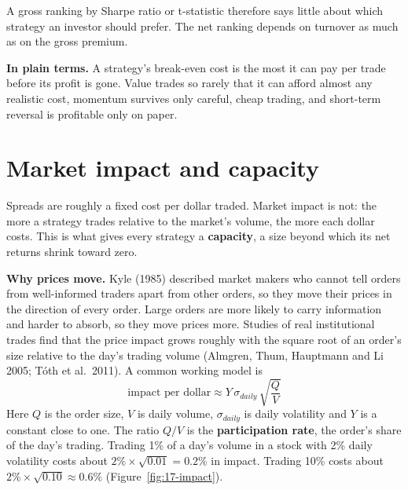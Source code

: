 
A gross ranking by Sharpe ratio or t-statistic therefore says little about which strategy an investor should prefer. The net ranking depends on turnover as much as on the gross premium.

\noindent\textbf{In plain terms.} A strategy's break-even cost is the most it can pay per trade before its profit is gone. Value trades so rarely that it can afford almost any realistic cost, momentum survives only careful, cheap trading, and short-term reversal is profitable only on paper.

\section{Market impact and capacity}
\label{sec:17-capacity}

Spreads are roughly a fixed cost per dollar traded. Market impact is not: the more a strategy trades relative to the market's volume, the more each dollar costs. This is what gives every strategy a \textbf{capacity}, a size beyond which its net returns shrink toward zero.

\textbf{Why prices move.} Kyle (1985) described market makers who cannot tell orders from well-informed traders apart from other orders, so they move their prices in the direction of every order. Large orders are more likely to carry information and harder to absorb, so they move prices more. Studies of real institutional trades find that the price impact grows roughly with the square root of an order's size relative to the day's trading volume (Almgren, Thum, Hauptmann and Li 2005; T\'oth et al.\ 2011). A common working model is
\begin{equation}
  \text{impact per dollar} \approx Y\,\sigma_{daily}\,\sqrt{\frac{Q}{V}}
  \label{eq:17-impact}
\end{equation}
Here $Q$ is the order size, $V$ is daily volume, $\sigma_{daily}$ is daily volatility and $Y$ is a constant close to one. The ratio $Q/V$ is the \textbf{participation rate}, the order's share of the day's trading. Trading 1\% of a day's volume in a stock with 2\% daily volatility costs about $2\% \times \sqrt{0.01} = 0.2\%$ in impact. Trading 10\% costs about $2\% \times \sqrt{0.10} \approx 0.6\%$ (Figure~\ref{fig:17-impact}).

